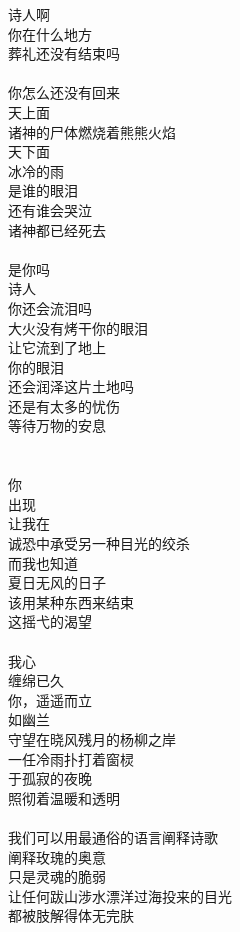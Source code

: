 诗人啊\\
你在什么地方\\
葬礼还没有结束吗\\
\\
你怎么还没有回来\\
天上面\\
诸神的尸体燃烧着熊熊火焰\\
天下面\\
冰冷的雨\\
是谁的眼泪\\
还有谁会哭泣\\
诸神都已经死去\\
\\
是你吗\\
诗人\\
你还会流泪吗\\
大火没有烤干你的眼泪\\
让它流到了地上\\
你的眼泪\\
还会润泽这片土地吗\\
还是有太多的忧伤\\
等待万物的安息\\
\\
\\
你\\
出现\\
让我在\\
诚恐中承受另一种目光的绞杀\\
而我也知道\\
夏日无风的日子\\
该用某种东西来结束\\
这摇弋的渴望\\
\\
我心\\
缠绵已久\\
你，遥遥而立\\
如幽兰\\
守望在晓风残月的杨柳之岸\\
一任冷雨扑打着窗棂\\
于孤寂的夜晚\\
照彻着温暖和透明\\
\\
我们可以用最通俗的语言阐释诗歌\\
阐释玫瑰的奥意\\
只是灵魂的脆弱\\
让任何跋山涉水漂洋过海投来的目光\\
都被肢解得体无完肤\\
\\
